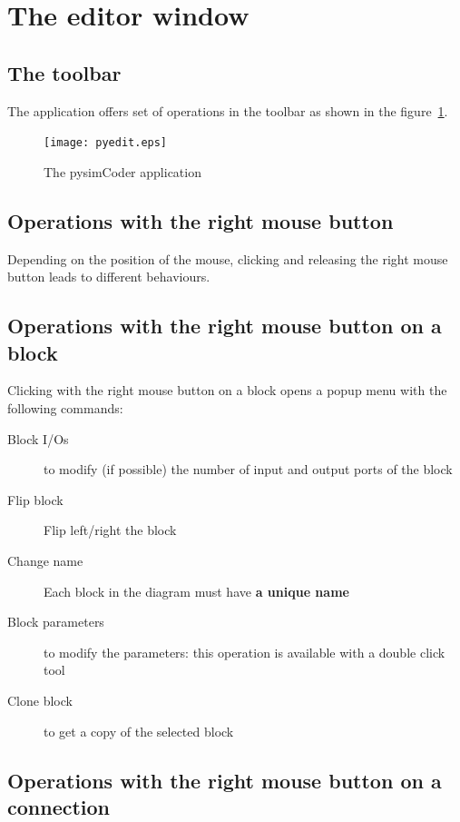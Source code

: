 \section{The editor window}

\subsection{The toolbar}

The application offers  set of operations in the toolbar as shown in the 
figure~\ref{Fig:pysimCoder}.

\begin{figure}[htbp]
 \centering
 \texttt{[image: pyedit.eps]}
 \caption{The pysimCoder application}
 \label{Fig:pysimCoder}
 \end{figure}

\subsection{Operations with the right mouse button}
Depending on the position of the mouse, clicking and releasing the right mouse 
button leads to different behaviours.

\subsection{Operations with the right mouse button on a block}

Clicking with the right mouse button on a block opens a popup menu with the 
following commands:

\begin{description}
\item [Block I/Os] to modify (if possible) the number of input and output ports 
of the block
\item [Flip block] Flip left/right the block
\item [Change name] Each block in the diagram must have \textbf{a unique name}
\item [Block parameters] to modify the parameters: this operation is available 
with a double click tool
\item [Clone block] to get a copy of the selected block
\end{description}

\subsection{Operations with the right mouse button on a connection}

